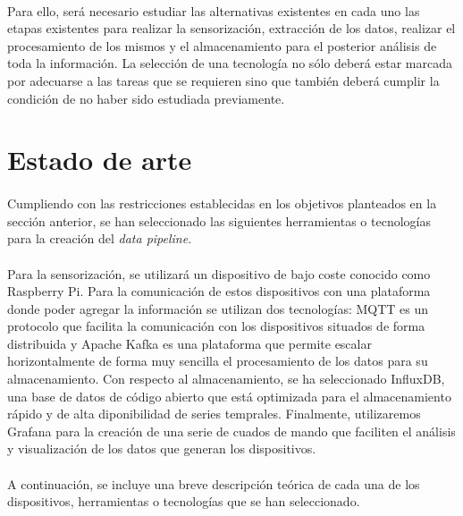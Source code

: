 \documentclass[12pt, a4paper]{article}
\begin{document}
        \paragraph{}
        Para ello, será necesario estudiar las alternativas existentes en cada uno las etapas existentes para realizar la sensorización, extracción de los datos, realizar el procesamiento de los mismos y el almacenamiento para el posterior análisis de toda la información. La selección de una tecnología no sólo deberá estar marcada por adecuarse a las tareas que se requieren sino que también deberá cumplir la condición de no haber sido estudiada previamente.

        \section{Estado de arte}

        \paragraph{}
        Cumpliendo con las restricciones establecidas en los objetivos planteados en la sección anterior, se han seleccionado las siguientes herramientas o tecnologías para la creación del \textit{data pipeline}. 
        
        \paragraph{}
        Para la sensorización, se utilizará un dispositivo de bajo coste conocido como Raspberry Pi. Para la comunicación de estos dispositivos con una plataforma donde poder agregar la información se utilizan dos tecnologías: MQTT es un protocolo que facilita la comunicación con los dispositivos situados de forma distribuida y Apache Kafka es una plataforma que permite escalar horizontalmente de forma muy sencilla el procesamiento de los datos para su almacenamiento. Con respecto al almacenamiento, se ha seleccionado InfluxDB, una base de datos de código abierto que está optimizada para el almacenamiento rápido y de alta diponibilidad de series temprales. Finalmente, utilizaremos Grafana para la creación de una serie de cuados de mando que faciliten el análisis y visualización de los datos que generan los dispositivos.

        \paragraph{}
        A continuación, se incluye una breve descripción teórica de cada una de los dispositivos, herramientas o tecnologías que se han seleccionado.
\end{document}
